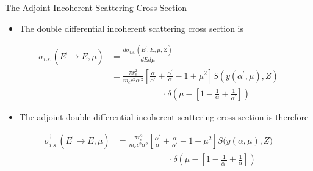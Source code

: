 \documentclass{beamer}
\begin{document}
\begin{frame}{The Adjoint Incoherent Scattering Cross Section}

  \begin{itemize}
    \item The double differential incoherent scattering cross section is
  \end{itemize}
  \begin{align}
    \sigma_{i.s.}(E^{'} \to E, \mu) & = 
    \frac{d\sigma_{i.s.}(E^{'},E,\mu,Z)}{dEd\mu} \nonumber \\
    & =  \frac{\pi r_e^2}{m_ec^2 \alpha^{'2}}
    \left[\frac{\alpha}{\alpha^{'}} + \frac{\alpha^{'}}{\alpha} - 
      1 + \mu^2\right] S\left(y(\alpha^{'},\mu),Z\right) \nonumber \\
    & \qquad \qquad \qquad \cdot \delta\left(\mu - \left[1-\frac{1}{\alpha} + 
      \frac{1}{\alpha^{'}}\right]\right) \nonumber
  \end{align}

  \begin{itemize}
    \item The adjoint double differential incoherent scattering cross section
      is therefore
  \end{itemize}
   \begin{align}
    \sigma_{i.s.}^{\dagger}(E^{'} \to E, \mu)  & =  
    \frac{\pi r_e^2}{m_ec^2 \alpha^{2}}
    \left[\frac{\alpha^{'}}{\alpha} + \frac{\alpha}{\alpha^{'}} - 
      1 + \mu^2\right] S\Big(y(\alpha,\mu),Z\Big) \nonumber \\
    & \qquad \qquad \qquad \cdot \delta\left(\mu - \left[1-\frac{1}{\alpha^{'}} 
      + \frac{1}{\alpha}\right]\right) \nonumber
  \end{align}

\end{frame}
\end{document}
